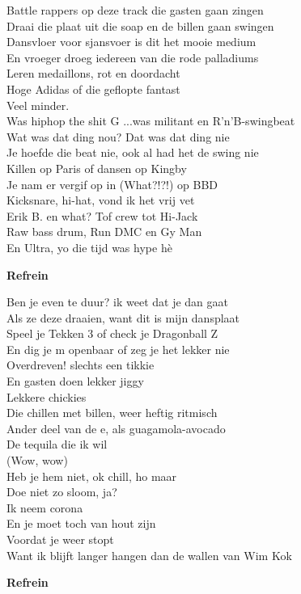 Battle rappers op deze track die gasten gaan zingen\\
Draai die plaat uit die soap en de billen gaan swingen\\
Dansvloer voor sjansvoer is dit het mooie medium\\
En vroeger droeg iedereen van die rode palladiums\\
Leren medaillons, rot en doordacht\\
Hoge Adidas of die geflopte fantast\\
Veel minder.\\
Was hiphop the shit G ...was militant en R'n'B-swingbeat\\
Wat was dat ding nou? Dat was dat ding nie\\
Je hoefde die beat nie, ook al had het de swing nie\\
Killen op Paris of dansen op Kingby\\
Je nam er vergif op in (What?!?!) op BBD\\
Kicksnare, hi-hat, vond ik het vrij vet\\
Erik B. en what? Tof crew tot Hi-Jack\\
Raw bass drum, Run DMC en Gy Man\\
En Ultra, yo die tijd was hype hè

\textbf{Refrein}

Ben je even te duur? ik weet dat je dan gaat\\
Als ze deze draaien, want dit is mijn dansplaat\\
Speel je Tekken 3 of check je Dragonball Z\\
En dig je m openbaar of zeg je het lekker nie\\
Overdreven! slechts een tikkie\\
En gasten doen lekker jiggy\\
Lekkere chickies\\
Die chillen met billen, weer heftig ritmisch\\
Ander deel van de e, als guagamola-avocado\\
De tequila die ik wil\\
(Wow, wow)\\
Heb je hem niet, ok chill, ho maar\\
Doe niet zo sloom, ja?\\
Ik neem corona\\
En je moet toch van hout zijn\\
Voordat je weer stopt\\
Want ik blijft langer hangen dan de wallen van Wim Kok

\textbf{Refrein}
